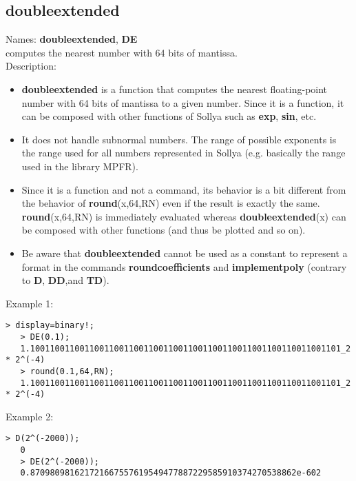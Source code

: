 \subsection{ doubleextended }
\noindent Names: \textbf{doubleextended}, \textbf{DE}\\
computes the nearest number with 64 bits of mantissa.\\

\noindent Description: \begin{itemize}

\item \textbf{doubleextended} is a function that computes the nearest floating-point number with
   64 bits of mantissa to a given number. Since it is a function, it can be
   composed with other functions of Sollya such as \textbf{exp}, \textbf{sin}, etc.

\item It does not handle subnormal numbers. The range of possible exponents is the 
   range used for all numbers represented in Sollya (e.g. basically the range 
   used in the library MPFR).

\item Since it is a function and not a command, its behavior is a bit different from 
   the behavior of \textbf{round}(x,64,RN) even if the result is exactly the same.
   \textbf{round}(x,64,RN) is immediately evaluated whereas \textbf{doubleextended}(x) can be composed 
   with other functions (and thus be plotted and so on).

\item Be aware that \textbf{doubleextended} cannot be used as a constant to represent a format in the
   commands \textbf{roundcoefficients} and \textbf{implementpoly} (contrary to \textbf{D}, \textbf{DD},and \textbf{TD}).
\end{itemize}
\noindent Example 1: 
\begin{center}\begin{minipage}{14.8cm}\begin{Verbatim}[frame=single]
   > display=binary!;
   > DE(0.1);
   1.100110011001100110011001100110011001100110011001100110011001101_2 * 2^(-4)
   > round(0.1,64,RN);
   1.100110011001100110011001100110011001100110011001100110011001101_2 * 2^(-4)
\end{Verbatim}
\end{minipage}\end{center}
\noindent Example 2: 
\begin{center}\begin{minipage}{14.8cm}\begin{Verbatim}[frame=single]
   > D(2^(-2000));
   0
   > DE(2^(-2000));
   0.870980981621721667557619549477887229585910374270538862e-602
\end{Verbatim}
\end{minipage}\end{center}
